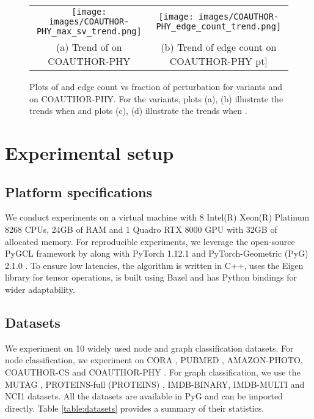 \documentclass{article}
\theoremstyle{plain}
\theoremstyle{definition}
\theoremstyle{remark}
\begin{document}
\begin{figure}[H]
\vskip 0.2in
\begin{center}
\begin{tabular}{cc}
\centering
  \texttt{[image: images/COAUTHOR-PHY\_max\_sv\_trend.png]} &   \texttt{[image: images/COAUTHOR-PHY\_edge\_count\_trend.png]} \\
(a) Trend of  on COAUTHOR-PHY & (b)  Trend of  edge count on COAUTHOR-PHY \2pt]
\end{tabular}
\caption{Plots of  and edge count vs fraction of perturbation  for  variants and  on COAUTHOR-PHY. For the  variants, plots (a), (b) illustrate the trends when  and plots (c), (d) illustrate the trends when .   }
\label{fig:rlap_ablation_coauthor_phy}
\end{center}
\vskip -0.2in
\end{figure}



\section{Experimental setup}
\label{appendix:experimental_setup}


\subsection{Platform specifications}
We conduct experiments on a virtual machine with 8 Intel(R) Xeon(R) Platinum 8268 CPUs, 24GB of RAM and 1 Quadro RTX 8000 GPU with 32GB of allocated memory. For reproducible experiments, we leverage the open-source PyGCL framework by \citet{zhu2021empirical} along with PyTorch 1.12.1 \citep{paszke2019pytorch} and PyTorch-Geometric (PyG) 2.1.0 \citep{Fey/Lenssen/2019}. To ensure low latencies, the  algorithm is written in C++, uses the Eigen library for tensor operations, is built using Bazel and has Python bindings for wider adaptability.

\subsection{Datasets}
We experiment on 10 widely used node and graph classification datasets. For node classification, we experiment on CORA \citep{mccallum2000automating}, PUBMED \citep{sen2008collective}, AMAZON-PHOTO, COAUTHOR-CS and COAUTHOR-PHY \citep{shchur2018pitfalls}.
For graph classification, we use the MUTAG \citep{debnath1991structure}, PROTEINS-full (PROTEINS) \citep{borgwardt2005protein}, IMDB-BINARY, IMDB-MULTI \citep{yanardag2015deep} and NCI1 \citep{wale2008comparison} datasets. All the datasets are available in PyG and can be imported directly. Table \ref{table:datasets} provides a summary of their statistics.
\end{document}
